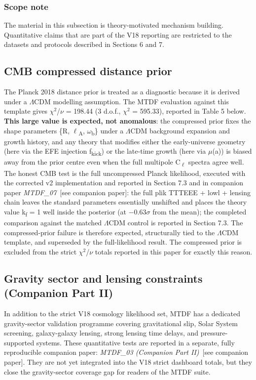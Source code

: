 \documentclass[11pt,a4paper]{article}
\begin{document}
\begin{mdframed}[linecolor=accent,linewidth=0.5pt,backgroundcolor=callout-bg,leftline=true,rightline=true,topline=true,bottomline=true,innerleftmargin=8pt,innerrightmargin=8pt,innertopmargin=6pt,innerbottommargin=6pt]
\subsubsection{Scope note}
The material in this subsection is theory-motivated mechanism building. Quantitative claims that are part of the V18 reporting are restricted to the datasets and protocols described in Sections 6 and 7.
\end{mdframed}

\subsection{CMB compressed distance prior}
The Planck 2018 distance prior is treated as a diagnostic because it is derived under a $\Lambda$CDM modelling assumption. The MTDF evaluation against this template gives $\chi$$^{2}$/$\nu$ = 198.44 (3 d.o.f., $\chi$$^{2}$ = 595.33), reported in Table 5 below. \textbf{This large value is expected, not anomalous}: the compressed prior fixes the shape parameters \{R, $\ell$\textsubscript{A}, $\omega$\textsubscript{b}\} under a $\Lambda$CDM background expansion and growth history, and any theory that modifies either the early-universe geometry (here via the EFE injection f\textsubscript{kick}) or the late-time growth (here via $\mu$(a)) is biased away from the prior centre even when the full multipole C\textsubscript{$\ell$} spectra agree well. The honest CMB test is the full uncompressed Planck likelihood, executed with the corrected v2 implementation and reported in Section 7.3 and in companion paper \textit{MTDF\_\allowbreak{}07}~[see companion paper]: the full plik TTTEEE + lowl + lensing chain leaves the standard parameters essentially unshifted and places the theory value k\textsubscript{f} = 1 well inside the posterior (at $-$0.63$\sigma$ from the mean); the completed comparison against the matched $\Lambda$CDM control is reported in Section 7.3. The compressed-prior failure is therefore expected, structurally tied to the $\Lambda$CDM template, and superseded by the full-likelihood result. The compressed prior is excluded from the strict $\chi$$^{2}$/$\nu$ totals reported in this paper for exactly this reason.

\subsection{Gravity sector and lensing constraints (Companion Part II)}
In addition to the strict V18 cosmology likelihood set, MTDF has a dedicated gravity-sector validation programme covering
gravitational slip, Solar System screening, galaxy-galaxy lensing, strong lensing time delays, and pressure-supported systems.
These quantitative tests are reported in a separate, fully reproducible companion paper:
\textit{MTDF\_\allowbreak{}03 (Companion Part II)}~[see companion paper].
They are not yet integrated into the V18 strict dashboard totals, but they close the gravity-sector coverage gap for readers of the MTDF suite.
\end{document}
